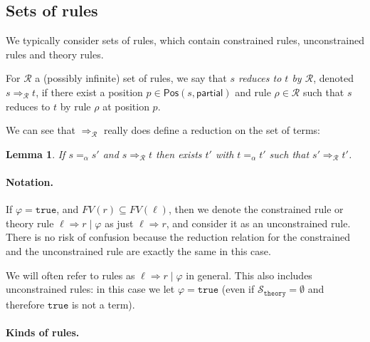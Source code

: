 \documentclass{lmcs}
\theoremstyle{theorem}\newtheorem{theorem}{Theorem}
\theoremstyle{theorem}\newtheorem{lemma}[theorem]{Lemma}
\theoremstyle{theorem}\newtheorem{corollary}[theorem]{Corollary}
\theoremstyle{definition}\newtheorem{definition}[theorem]{Definition}
\theoremstyle{definition}\newtheorem{example}[theorem]{Example}
\newcommand{\thSorts}{\mathcal{S}_{\mathtt{theory}}}
\newcommand{\Rules}{\mathcal{R}}
\newcommand{\FV}{\mathit{FV}}
\newcommand{\Positions}{\mathsf{Pos}}
\newcommand{\arrz}{\Rightarrow}
\newcommand{\arr}[1]{\arrz_{#1}}
\newcommand{\symb}[1]{\mathtt{#1}}
\newcommand{\strue}{\symb{true}}
\newcommand{\myparagraph}[1]{\paragraph{\textbf{#1.}}}
\begin{document}
\subsection{Sets of rules}

We typically consider sets of rules, which contain constrained rules,
unconstrained rules and theory rules.

For $\Rules$ a (possibly infinite) set of rules, we say that \emph{$s$ reduces
to $t$ by $\Rules$}, denoted $s \arr{\Rules} t$, if there
exist a position $p \in \Positions(s,\mathsf{partial})$ and rule $\rho \in
\Rules$ such that $s$ reduces to $t$ by rule $\rho$ at position $p$.

We can see that $\arr{\Rules}$ really does define a reduction on the set of terms:

\begin{lemma}
If $s =_\alpha s'$ and $s \arr{\Rules} t$ then exists $t'$ with $t =_\alpha t'$
such that $s' \arr{\Rules} t'$.
\end{lemma}

\myparagraph{Notation} If $\varphi = \strue$, and $\FV(r) \subseteq \FV(\ell)$,
then we denote the constrained rule or theory rule $\ell \arrz r \mid \varphi$
as just $\ell \arrz r$, and consider it as an unconstrained rule.
There is no risk of confusion because the reduction relation for the constrained
and the unconstrained rule are exactly the same in this case.

We will often refer to rules as $\ell \arrz r \mid \varphi$ in general.  This
also includes unconstrained rules: in this case  we let $\varphi = \strue$
(even if $\thSorts = \emptyset$ and therefore $\strue$ is not a term).

\myparagraph{Kinds of rules}
\end{document}
